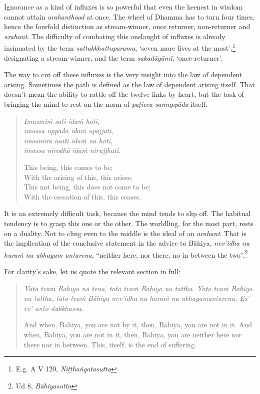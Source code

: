 Ignorance as a kind of influxes is so powerful that even the keenest in wisdom cannot attain \emph{arahanthood} at once. The wheel of Dhamma has to turn four times, hence the fourfold distinction as stream-winner, once returner, non-returner and \emph{arahant}. The difficulty of combating this onslaught of influxes is already insinuated by the term \emph{sattakkhattuparama}, `seven more lives at the most',\footnote{E.g. A V 120, \emph{Niṭṭhaṅgatasutta}} designating a stream-winner, and the term \emph{sakadāgāmī}, `once-returner'.

The way to cut off these influxes is the very insight into the law of dependent arising. Sometimes the path is defined as the law of dependent arising itself. That doesn't mean the ability to rattle off the twelve links by heart, but the task of bringing the mind to rest on the norm of \emph{paṭicca samuppāda} itself.

\begin{quote}
\emph{Imasmiṁ sati idaṁ hoti,}\\
\emph{imassa uppādā idaṁ upajjati,}\\
\emph{imasmiṁ asati idaṁ na hoti,}\\
\emph{imassa nirodhā idaṁ nirujjhati.}

This being, this comes to be;\\
With the arising of this, this arises;\\
This not being, this does not come to be;\\
With the cessation of this, this ceases.
\end{quote}

It is an extremely difficult task, because the mind tends to slip off. The habitual tendency is to grasp this one or the other. The worldling, for the most part, rests on a duality. Not to cling even to the middle is the ideal of an \emph{arahant}. That is the implication of the conclusive statement in the advice to Bāhiya, \emph{nev'idha na huraṁ na ubhayam antarena}, ``neither here, nor there, no in between the two''.\footnote{Ud 8, \emph{Bāhiyasutta}}

For clarity's sake, let us quote the relevant section in full:

\begin{quote}
\emph{Yato tvaṁ Bāhiya na tena, tato tvaṁ Bāhiya na tattha. Yato tvaṁ Bāhiya na tattha, tato tvaṁ Bāhiya nev'idha na huraṁ na ubhayamantarena. Es' ev' anto dukkhassa}.

And when, Bāhiya, you are not by it, then, Bāhiya, you are not in it. And when, Bāhiya, you are not in it, then, Bāhiya, you are neither here nor there nor in between. This, itself, is the end of suffering.
\end{quote}

